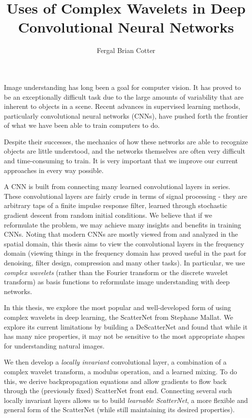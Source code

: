 \documentclass{article}
\begin{document}
\title{Uses of Complex Wavelets in Deep Convolutional Neural Networks}
\author{Fergal Brian Cotter}
\maketitle

  Image understanding has long been a goal for computer vision. It has proved
  to be an exceptionally difficult task due to the large amounts of variability
  that are inherent to objects in a scene. Recent advances in supervised learning
  methods, particularly convolutional neural networks (CNNs), have pushed forth the frontier
  of what we have been able to train computers to do.

  Despite their successes, the mechanics of how these networks are able to
  recognize objects are little understood, and the networks themselves are often
  very difficult and time-consuming to train. It is very important that we improve our
  current approaches in every way possible.

  A CNN is built from connecting many learned convolutional layers in series.
  These convolutional layers are fairly crude in terms of signal
  processing - they are arbitrary taps of a finite impulse response filter,
  learned through stochastic gradient descent from random initial conditions. We
  believe that if we reformulate the problem, we may achieve many insights and
  benefits in training CNNs. Noting that modern CNNs are mostly viewed from and
  analyzed in the spatial domain, this thesis aims to view the convolutional
  layers in the frequency domain (viewing things in the frequency
  domain has proved useful in the past for denoising, filter
  design, compression and many other tasks). In particular, we use \emph{complex
  wavelets} (rather than the Fourier transform or the discrete wavelet
  transform) as basis functions to reformulate image understanding with deep
  networks.

  In this thesis, we explore the most popular and well-developed form of
  using complex wavelets in deep learning, the ScatterNet from Stephane Mallat.
  We explore its current limitations by building a DeScatterNet and found that
  while it has many nice properties, it may not be sensitive to the most
  appropriate shapes for understanding natural images.

  We then develop a \emph{locally invariant} convolutional layer, a combination of a complex wavelet
  transform, a modulus operation, and a learned mixing. To do this, we derive
  backpropagation equations and allow gradients to flow back through the
  (previously fixed) ScatterNet front end. Connecting several such
  locally invariant layers allows us to build \emph{learnable ScatterNet}, a more flexible and general
  form of the ScatterNet (while still maintaining its desired properties).
\end{document}
